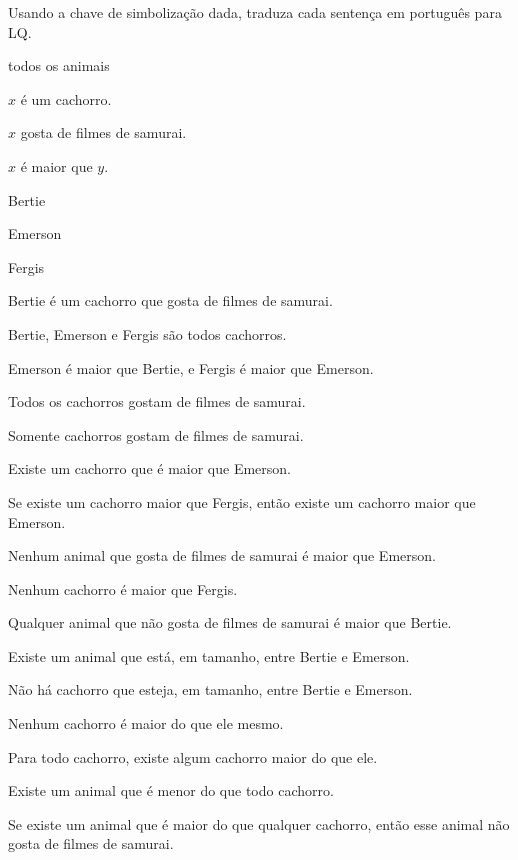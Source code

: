 \problempart Usando a chave de simbolização dada, traduza cada sentença em português para LQ.
\begin{ekey}
\item[UD:] todos os animais
\item[Dx:] $x$ é um cachorro.
\item[Sx:] $x$ gosta de filmes de samurai.
\item[Lxy:] $x$ é maior que $y$.
\item[b:] Bertie
\item[e:] Emerson
\item[f:] Fergis
\end{ekey}
\begin{earg}
\item Bertie é um cachorro que gosta de filmes de samurai.
\item Bertie, Emerson e Fergis são todos cachorros.
\item Emerson é maior que Bertie, e Fergis é maior que Emerson.
\item Todos os cachorros gostam de filmes de samurai.
\item Somente cachorros gostam de filmes de samurai.
\item Existe um cachorro que é maior que Emerson.
\item Se existe um cachorro maior que Fergis, então existe um cachorro maior que Emerson.
\item Nenhum animal que gosta de filmes de samurai é maior que Emerson.
\item Nenhum cachorro é maior que Fergis.
\item Qualquer animal que não gosta de filmes de samurai é maior que Bertie.
\item Existe um animal que está, em tamanho, entre Bertie e Emerson.
\item Não há cachorro que esteja, em tamanho, entre Bertie e Emerson.
\item Nenhum cachorro é maior do que ele mesmo.
\item Para todo cachorro, existe algum cachorro maior do que ele.
\item Existe um animal que é menor do que todo cachorro.
\item Se existe um animal que é maior do que qualquer cachorro, então esse animal não gosta de filmes de samurai.
\end{earg}



